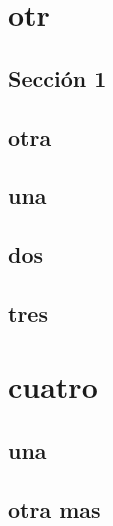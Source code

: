 \chapter{otr}
\label{C:otr}

\section{Secci\'{o}n 1}
\label{S:seccion-1}

\section{otra}
\label{S:otra}

\section{una}
\label{S:una}

\section{dos}
\label{S:dos}

\section{tres}
\label{S:tres}

\chapter{cuatro}
\label{C:cuatro}

\section{una}
\label{S:una-1}

\section{otra mas}
\label{S:otra-mas}


